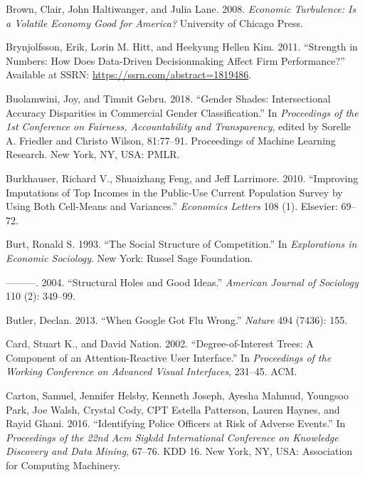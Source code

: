 \documentclass[]{krantz}
\begin{document}
\hypertarget{ref-brown2008economic}{}
Brown, Clair, John Haltiwanger, and Julia Lane. 2008. \emph{Economic
Turbulence: Is a Volatile Economy Good for America?} University of
Chicago Press.

\hypertarget{ref-brynjolfsson2011strength}{}
Brynjolfsson, Erik, Lorin M. Hitt, and Heekyung Hellen Kim. 2011.
``Strength in Numbers: How Does Data-Driven Decisionmaking Affect Firm
Performance?'' Available at SSRN:
\url{https://ssrn.com/abstract=1819486}.

\hypertarget{ref-buolamwini2018}{}
Buolamwini, Joy, and Timnit Gebru. 2018. ``Gender Shades: Intersectional
Accuracy Disparities in Commercial Gender Classification.'' In
\emph{Proceedings of the 1st Conference on Fairness, Accountability and
Transparency}, edited by Sorelle A. Friedler and Christo Wilson,
81:77--91. Proceedings of Machine Learning Research. New York, NY, USA:
PMLR.

\hypertarget{ref-burkhauser2010improving}{}
Burkhauser, Richard V., Shuaizhang Feng, and Jeff Larrimore. 2010.
``Improving Imputations of Top Incomes in the Public-Use Current
Population Survey by Using Both Cell-Means and Variances.''
\emph{Economics Letters} 108 (1). Elsevier: 69--72.

\hypertarget{ref-burt1993social}{}
Burt, Ronald S. 1993. ``The Social Structure of Competition.'' In
\emph{Explorations in Economic Sociology}. New York: Russel Sage
Foundation.

\hypertarget{ref-burt2004structural}{}
---------. 2004. ``Structural Holes and Good Ideas.'' \emph{American
Journal of Sociology} 110 (2): 349--99.

\hypertarget{ref-butler2013google}{}
Butler, Declan. 2013. ``When Google Got Flu Wrong.'' \emph{Nature} 494
(7436): 155.

\hypertarget{ref-card2002degree}{}
Card, Stuart K., and David Nation. 2002. ``Degree-of-Interest Trees: A
Component of an Attention-Reactive User Interface.'' In
\emph{Proceedings of the Working Conference on Advanced Visual
Interfaces}, 231--45. ACM.

\hypertarget{ref-Carton2016}{}
Carton, Samuel, Jennifer Helsby, Kenneth Joseph, Ayesha Mahmud, Youngsoo
Park, Joe Walsh, Crystal Cody, CPT Estella Patterson, Lauren Haynes, and
Rayid Ghani. 2016. ``Identifying Police Officers at Risk of Adverse
Events.'' In \emph{Proceedings of the 22nd Acm Sigkdd International
Conference on Knowledge Discovery and Data Mining}, 67--76. KDD 16. New
York, NY, USA: Association for Computing Machinery.
\end{document}

